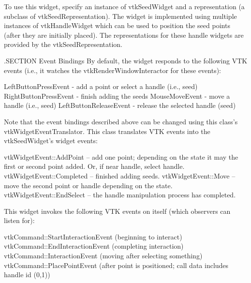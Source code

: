 To use this widget, specify an instance of vtk\-Seed\-Widget and a representation (a subclass of vtk\-Seed\-Representation). The widget is implemented using multiple instances of vtk\-Handle\-Widget which can be used to position the seed points (after they are initially placed). The representations for these handle widgets are provided by the vtk\-Seed\-Representation.

.S\-E\-C\-T\-I\-O\-N Event Bindings By default, the widget responds to the following V\-T\-K events (i.\-e., it watches the vtk\-Render\-Window\-Interactor for these events)\-: 
\begin{DoxyPre}
   LeftButtonPressEvent - add a point or select a handle (i.e., seed)
   RightButtonPressEvent - finish adding the seeds
   MouseMoveEvent - move a handle (i.e., seed)
   LeftButtonReleaseEvent - release the selected handle (seed)
 \end{DoxyPre}


Note that the event bindings described above can be changed using this class's vtk\-Widget\-Event\-Translator. This class translates V\-T\-K events into the vtk\-Seed\-Widget's widget events\-: 
\begin{DoxyPre}
   vtkWidgetEvent::AddPoint -- add one point; depending on the state
                               it may the first or second point added. Or,
                               if near handle, select handle.
   vtkWidgetEvent::Completed -- finished adding seeds.
   vtkWidgetEvent::Move -- move the second point or handle depending on the state.
   vtkWidgetEvent::EndSelect -- the handle manipulation process has completed.
 \end{DoxyPre}


This widget invokes the following V\-T\-K events on itself (which observers can listen for)\-: 
\begin{DoxyPre}
   vtkCommand::StartInteractionEvent (beginning to interact)
   vtkCommand::EndInteractionEvent (completing interaction)
   vtkCommand::InteractionEvent (moving after selecting something)
   vtkCommand::PlacePointEvent (after point is positioned; 
                                call data includes handle id (0,1))
 \end{DoxyPre}


